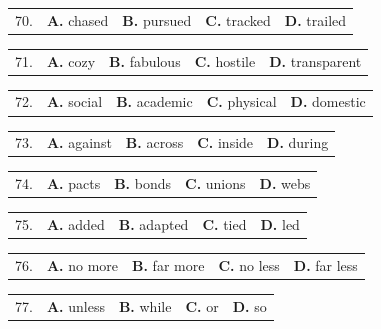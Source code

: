 \documentclass[UTF8,11pt]{ctexart}
\begin{document}
\noindent\begin{tabularx}{\linewidth}{@{}lXXXX@{}}70. & \textbf{A.} chased & \textbf{B.} pursued & \textbf{C.} tracked & \textbf{D.} trailed\\\end{tabularx}\par

\noindent\begin{tabularx}{\linewidth}{@{}lXXXX@{}}71. & \textbf{A.} cozy & \textbf{B.} fabulous & \textbf{C.} hostile & \textbf{D.} transparent\\\end{tabularx}\par

\noindent\begin{tabularx}{\linewidth}{@{}lXXXX@{}}72. & \textbf{A.} social & \textbf{B.} academic & \textbf{C.} physical & \textbf{D.} domestic\\\end{tabularx}\par

\noindent\begin{tabularx}{\linewidth}{@{}lXXXX@{}}73. & \textbf{A.} against & \textbf{B.} across & \textbf{C.} inside & \textbf{D.} during\\\end{tabularx}\par

\noindent\begin{tabularx}{\linewidth}{@{}lXXXX@{}}74. & \textbf{A.} pacts & \textbf{B.} bonds & \textbf{C.} unions & \textbf{D.} webs\\\end{tabularx}\par

\noindent\begin{tabularx}{\linewidth}{@{}lXXXX@{}}75. & \textbf{A.} added & \textbf{B.} adapted & \textbf{C.} tied & \textbf{D.} led\\\end{tabularx}\par

\noindent\begin{tabularx}{\linewidth}{@{}lXXXX@{}}76. & \textbf{A.} no more & \textbf{B.} far more & \textbf{C.} no less & \textbf{D.} far less\\\end{tabularx}\par

\noindent\begin{tabularx}{\linewidth}{@{}lXXXX@{}}77. & \textbf{A.} unless & \textbf{B.} while & \textbf{C.} or & \textbf{D.} so\\\end{tabularx}\par
\end{document}
